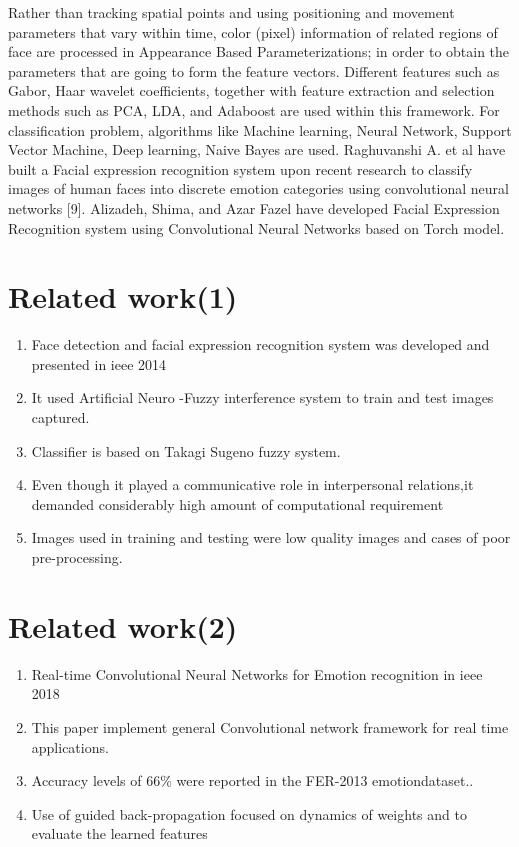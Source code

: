 \documentclass[12pt,a4paper,final]{extreport}
\begin{document}
Rather than tracking spatial points and using positioning and movement parameters that vary
within time, color (pixel) information of related regions of face are processed in Appearance
Based Parameterizations; in order to obtain the parameters that are going to form the feature vectors. Different features such as Gabor, Haar wavelet coefficients, together with feature
extraction and selection methods such as PCA, LDA, and Adaboost are used within this
framework.
\vspace{0.5cm}
For classification problem, algorithms like Machine learning, Neural Network, Support Vector
Machine, Deep learning, Naive Bayes are used.
\vspace{0.5cm}
Raghuvanshi A. et al have built a Facial expression recognition system upon recent research to
classify images of human faces into discrete emotion categories using convolutional neural
networks [9]. Alizadeh, Shima, and Azar Fazel have developed Facial Expression Recognition
system using Convolutional Neural Networks based on Torch model.
\section{Related work(1)}
\begin{enumerate}
	\item Face detection and facial expression recognition system was developed and presented in ieee 2014
	\item It used Artificial Neuro -Fuzzy interference system to train and test images captured.
	\item Classifier is based on Takagi Sugeno fuzzy system.
	\item Even though it played a communicative role in interpersonal relations,it demanded considerably high amount of computational requirement
	\item Images used in training and testing were low quality images and cases of poor pre-processing.
\end{enumerate}
\section{Related work(2)}
\begin{enumerate}
	\item Real-time Convolutional Neural Networks for Emotion recognition in ieee 2018
	\item This paper implement general Convolutional network framework for real time applications.
	\item Accuracy levels of 66\% were reported in the FER-2013 emotiondataset..
	\item Use of guided back-propagation focused on dynamics of weights and to evaluate the learned features
\end{enumerate}
\end{document}
